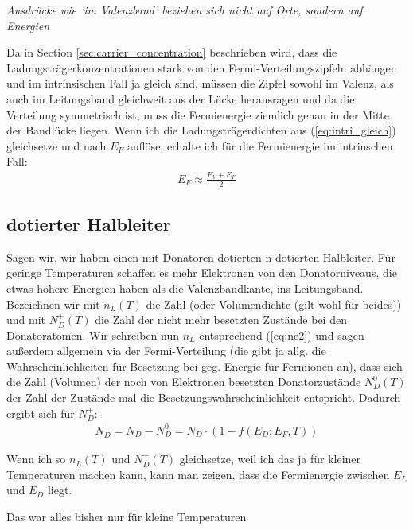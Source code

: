 \documentclass[paper=a4,10pt]{scrartcl}
\begin{document}
\textit{Ausdrücke wie 'im Valenzband' beziehen sich nicht auf Orte, sondern auf Energien}

Da in Section \ref{sec:carrier_concentration} beschrieben wird, dass die Ladungsträgerkonzentrationen stark von den Fermi-Verteilungszipfeln abhängen und im intrinsischen Fall ja gleich sind, müssen die Zipfel sowohl im Valenz, als auch im Leitungsband gleichweit aus der Lücke herausragen und da die Verteilung symmetrisch ist, muss die Fermienergie ziemlich genau in der Mitte der Bandlücke liegen.
Wenn ich die Ladungsträgerdichten aus (\ref{eq:intri_gleich}) gleichsetze und nach $E_F$ auflöse, erhalte ich für die Fermienergie im intrinschen Fall:
\begin{align}
E_F \approx \frac{E_V + E_F}{2}
\end{align} 

\subsection{dotierter Halbleiter}
Sagen wir, wir haben einen mit Donatoren dotierten n-dotierten Halbleiter. Für geringe Temperaturen schaffen es mehr Elektronen von den Donatorniveaus, die etwas höhere Energien haben als die Valenzbandkante, ins Leitungsband. Bezeichnen wir mit $n_L(T)$ die Zahl (oder Volumendichte (gilt wohl für beides)) und mit $N^+_D(T)$ die Zahl der nicht mehr besetzten Zustände bei den Donatoratomen.
Wir schreiben nun $n_L$ entsprechend (\ref{eq:ne2}) und sagen außerdem allgemein via der Fermi-Verteilung (die gibt ja allg. die Wahrscheinlichkeiten für Besetzung bei geg. Energie für Fermionen an), dass sich die Zahl (Volumen) der noch von Elektronen besetzten Donatorzustände $N_D^0(T)$ der Zahl der Zustände mal die Besetzungswahrscheinlichkeit entspricht. Dadurch ergibt sich für $N^+_D$:
\begin{align}
N^+_D = N_D - N^0_D = N_D \cdot \left( 1 - f(E_D; E_F, T)\right) 
\end{align}

Wenn ich so $n_L(T)$ und $N^+_D(T)$ gleichsetze, weil ich das ja für kleiner Temperaturen machen kann, kann man zeigen, dass die Fermienergie zwischen $E_L$ und $E_D$ liegt.

Das war alles bisher nur für kleine Temperaturen 
\end{document}
